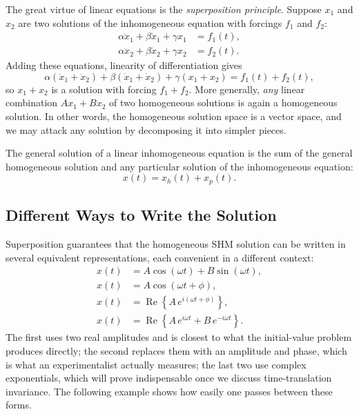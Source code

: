 The great virtue of linear equations is the \emph{superposition principle}. Suppose $x_1$ and $x_2$ are two solutions of the inhomogeneous equation with forcings $f_1$ and $f_2$:
\begin{align}
    \alpha\ddot{x}_1 + \beta\dot{x}_1 + \gamma x_1 &= f_1(t), \\
    \alpha\ddot{x}_2 + \beta\dot{x}_2 + \gamma x_2 &= f_2(t).
\end{align}
Adding these equations, linearity of differentiation gives
\begin{equation}
    \alpha(\ddot{x}_1 + \ddot{x}_2) + \beta(\dot{x}_1 + \dot{x}_2) + \gamma(x_1 + x_2) = f_1(t) + f_2(t),
\end{equation}
so $x_1 + x_2$ is a solution with forcing $f_1 + f_2$. More generally, \emph{any} linear combination $A x_1 + B x_2$ of two homogeneous solutions is again a homogeneous solution. In other words, the homogeneous solution space is a vector space, and we may attack any solution by decomposing it into simpler pieces.

\begin{theorem}
The general solution of a linear inhomogeneous equation is the sum of the general homogeneous solution and any particular solution of the inhomogeneous equation:
\begin{equation}
    x(t) = x_h(t) + x_p(t).
\end{equation}
\end{theorem}

\subsection{Different Ways to Write the Solution}

Superposition guarantees that the homogeneous SHM solution can be written in several equivalent representations, each convenient in a different context:
\begin{align}
    x(t) &= A\cos(\omega t) + B\sin(\omega t), \\
    x(t) &= A\cos(\omega t + \phi), \\
    x(t) &= \operatorname{Re}\!\left\{A\,e^{i(\omega t + \phi)}\right\}, \\
    x(t) &= \operatorname{Re}\!\left\{A\,e^{i\omega t} + B\,e^{-i\omega t}\right\}.
\end{align}
The first uses two real amplitudes and is closest to what the initial-value problem produces directly; the second replaces them with an amplitude and phase, which is what an experimentalist actually measures; the last two use complex exponentials, which will prove indispensable once we discuss time-translation invariance. The following example shows how easily one passes between these forms.

